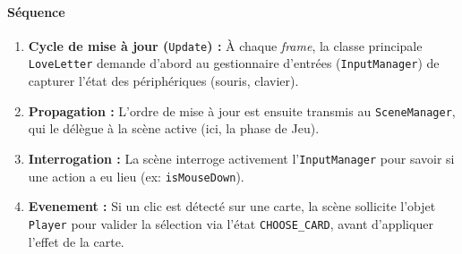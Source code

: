 \documentclass[paper=a4,fontsize=12pt,titlepage]{scrartcl}
\begin{document}
    \paragraph{Séquence}
    \begin{enumerate}
        \item \textbf{Cycle de mise à jour (}\verb|Update|\textbf{) :} À chaque \textit{frame},
        la classe principale \texttt{LoveLetter} demande d'abord au gestionnaire d'entrées (\texttt{InputManager}) de capturer l'état des périphériques (souris, clavier).
        \item \textbf{Propagation :} L'ordre de mise à jour est ensuite transmis au \texttt{SceneManager}, qui le délègue à la scène active (ici, la phase de Jeu).
        \item \textbf{Interrogation :} La scène interroge activement l'\texttt{InputManager} pour savoir si une action a eu lieu (ex: \texttt{isMouseDown}).
        \item \textbf{Evenement :} Si un clic est détecté sur une carte, la scène sollicite l'objet \texttt{Player} pour valider la sélection via l'état \verb|CHOOSE_CARD|, avant d'appliquer l'effet de la carte.
    \end{enumerate}
\end{document}
